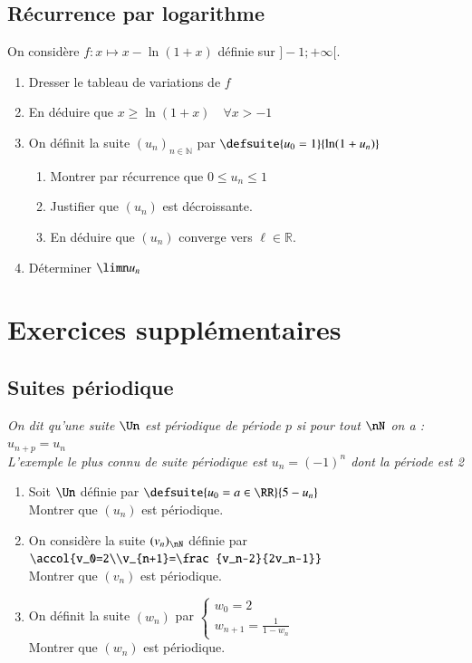 \documentclass[oneside,12pt]{article}          %
\begin{document}
\subsection{Récurrence par logarithme}
On considère $f : x \mapsto x - \ln(1 + x)$ définie sur $]-1; +\infty[$.
\begin{enumerate}
    \item Dresser le tableau de variations de $f$
    \item En déduire que $x \geq \ln(1 + x) \quad \forall x > -1$
    \item On définit la suite $(u_n)_{n \in \mathbb{N}}$ par $\defsuite{u_0=1}{\ln(1+u_n)}$
    \begin{enumerate}
        \item Montrer par récurrence que $0 \leq u_n \leq 1$
        \item Justifier que $(u_n)$ est décroissante.
        \item En déduire que $(u_n)$ converge vers $\ell \in \mathbb{R}$.
    \end{enumerate}
    \item Déterminer $\limn u_n$
\end{enumerate}



\section{Exercices supplémentaires}

\subsection{Suites périodique}
\textit{On dit qu'une suite $\Un$ est périodique de période $p$ si pour tout $\nN$ on a : $u_{n+p}=u_n$ \\
L'exemple le plus connu de suite périodique est $u_n=(-1)^n$ dont la période est 2}
\begin{enumerate}
    \item Soit $\Un$ définie par $\defsuite{u_0=a\in\RR}{5-u_n}$\\
    Montrer que $(u_n)$ est périodique.
    \item On considère la suite $(v_n)_{\nN}$ définie par $\accol{v_0=2\\v_{n+1}=\frac{v_n-2}{2v_n-1}}$\\
    Montrer que $(v_n)$ est périodique.
    \item On définit la suite $(w_n)$ par $\begin{cases}w_0=2\\w_{n+1}=\frac{1}{1-w_n}\end{cases}$\\
    Montrer que $(w_n)$ est périodique.
\end{enumerate}
\end{document}
